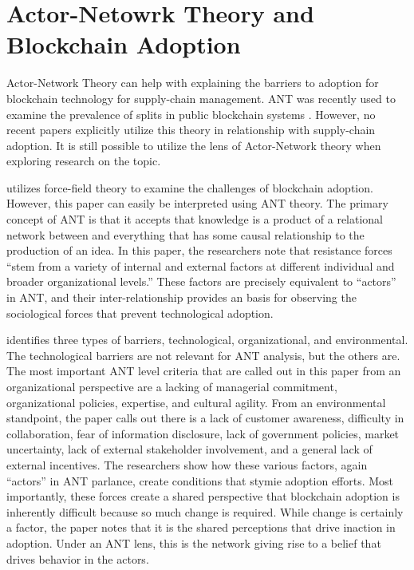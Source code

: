 \section{Actor-Netowrk Theory and Blockchain Adoption}

Actor-Network Theory can help with explaining the barriers to adoption for blockchain technology for supply-chain management. ANT was recently used to examine the prevalence of splits in public blockchain systems \parencite{islamWhyBlockchainsSplit2019}. However, no recent papers explicitly utilize this theory in relationship with supply-chain adoption.  It is still possible to utilize the lens of Actor-Network theory when exploring research on the topic.


\textcite{kouhizadehBlockchainTechnologySustainable2021} utilizes force-field theory to examine the challenges of blockchain adoption. However, this paper can easily be interpreted using ANT theory. The primary concept of ANT is that it accepts that knowledge is a product of a relational network between and everything that has some causal relationship to the production of an idea. In this paper, the researchers note that resistance forces ``stem from a variety of internal and external factors at different individual and broader organizational levels.'' These factors are precisely equivalent to ``actors'' in ANT, and their inter-relationship provides an basis for observing the sociological forces that prevent technological adoption.

\textcite{kouhizadehBlockchainTechnologySustainable2021} identifies three types of barriers, technological, organizational, and environmental. The technological barriers are not relevant for ANT analysis, but the others are. The most important ANT level criteria that are called out in this paper from an organizational perspective are a lacking of managerial commitment, organizational policies, expertise, and cultural agility. From an environmental standpoint, the paper calls out there is a lack of customer awareness, difficulty in collaboration, fear of information disclosure,  lack of government policies, market uncertainty, lack of external stakeholder involvement, and a general lack of external incentives. The researchers show how these various factors, again ``actors'' in ANT parlance, create conditions that stymie adoption efforts. Most importantly, these forces create a shared perspective that blockchain adoption is inherently difficult because so much change is required. While change is certainly a factor, the paper notes that it is the shared perceptions that drive inaction in adoption. Under an ANT lens, this is the network giving rise to a belief that drives behavior in the actors.

